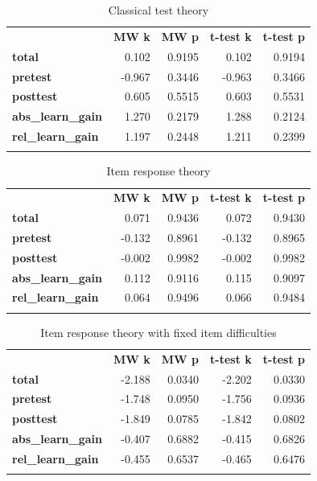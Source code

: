 \begin{longtable}[c]{@{}lrrrr@{}}
\caption{Classical test theory}
\endfirsthead
\endhead
\toprule\addlinespace
& \textbf{MW k} & \textbf{MW p} &
\textbf{t-test k} & \textbf{t-test p}
\\\addlinespace
\midrule
\textbf{total} & 0.102 & 0.9195 & 0.102 & 0.9194
\\\addlinespace
\textbf{pretest} & -0.967 & 0.3446 & -0.963 & 0.3466
\\\addlinespace
\textbf{posttest} & 0.605 & 0.5515 & 0.603 & 0.5531
\\\addlinespace
\textbf{abs\_learn\_gain} & 1.270 & 0.2179 & 1.288 & 0.2124
\\\addlinespace
\textbf{rel\_learn\_gain} & 1.197 & 0.2448 & 1.211 & 0.2399
\\\addlinespace
\bottomrule
    \label{tab:comp_cond_ctt_comp}
\end{longtable}

\begin{longtable}[c]{@{}lrrrr@{}}
\caption{Item response theory}
\endfirsthead
\endhead
\toprule\addlinespace
& \textbf{MW k} & \textbf{MW p} &
\textbf{t-test k} & \textbf{t-test p}
\\\addlinespace
\midrule
\textbf{total} & 0.071 & 0.9436 & 0.072 & 0.9430
\\\addlinespace
\textbf{pretest} & -0.132 & 0.8961 & -0.132 & 0.8965
\\\addlinespace
\textbf{posttest} & -0.002 & 0.9982 & -0.002 & 0.9982
\\\addlinespace
\textbf{abs\_learn\_gain} & 0.112 & 0.9116 & 0.115 & 0.9097
\\\addlinespace
\textbf{rel\_learn\_gain} & 0.064 & 0.9496 & 0.066 & 0.9484
\\\addlinespace
\bottomrule
    \label{tab:comp_cond_irt_comp}
\end{longtable}

\begin{longtable}[c]{@{}lrrrr@{}}
\caption{Item response theory with fixed item difficulties}
\endfirsthead
\endhead
\toprule\addlinespace
& \textbf{MW k} & \textbf{MW p} &
\textbf{t-test k} & \textbf{t-test p}
\\\addlinespace
\midrule
\textbf{total} & -2.188 & 0.0340 & -2.202 & 0.0330
\\\addlinespace
\textbf{pretest} & -1.748 & 0.0950 & -1.756 & 0.0936
\\\addlinespace
\textbf{posttest} & -1.849 & 0.0785 & -1.842 & 0.0802
\\\addlinespace
\textbf{abs\_learn\_gain} & -0.407 & 0.6882 & -0.415 & 0.6826
\\\addlinespace
\textbf{rel\_learn\_gain} & -0.455 & 0.6537 & -0.465 & 0.6476
\\\addlinespace
\bottomrule
    \label{tab:comp_cond_adj_irt_comp}
\end{longtable}


